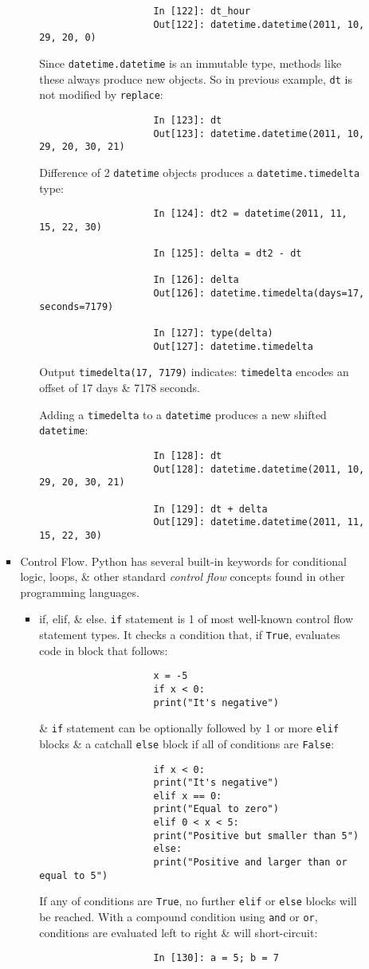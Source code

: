\documentclass{article}
\begin{document}
\begin{itemize}
\begin{itemize}
\begin{itemize}
\begin{itemize}
\begin{verbatim}
					In [122]: dt_hour
					Out[122]: datetime.datetime(2011, 10, 29, 20, 0)
				\end{verbatim}
				Since {\tt datetime.datetime} is an immutable type, methods like these always produce new objects. So in previous example, {\tt dt} is not modified by {\tt replace}:
				\begin{verbatim}
					In [123]: dt
					Out[123]: datetime.datetime(2011, 10, 29, 20, 30, 21)
				\end{verbatim}
				Difference of 2 {\tt datetime} objects produces a {\tt datetime.timedelta} type:
				\begin{verbatim}
					In [124]: dt2 = datetime(2011, 11, 15, 22, 30)
					
					In [125]: delta = dt2 - dt
					
					In [126]: delta
					Out[126]: datetime.timedelta(days=17, seconds=7179)
					
					In [127]: type(delta)
					Out[127]: datetime.timedelta
				\end{verbatim}
				Output {\tt timedelta(17, 7179)} indicates: {\tt timedelta} encodes an offset of 17 days \& 7178 seconds.
				
				Adding a {\tt timedelta} to a {\tt datetime} produces a new shifted {\tt datetime}:
				\begin{verbatim}
					In [128]: dt
					Out[128]: datetime.datetime(2011, 10, 29, 20, 30, 21)
					
					In [129]: dt + delta
					Out[129]: datetime.datetime(2011, 11, 15, 22, 30)
				\end{verbatim}
			\end{itemize}
			\item {\sf Control Flow.} Python has several built-in keywords for conditional logic, loops, \& other standard {\it control flow} concepts found in other programming languages.
			\begin{itemize}
				\item {\sf if, elif, \& else.} {\tt if} statement is 1 of most well-known control flow statement types. It checks a condition that, if {\tt True}, evaluates code in block that follows:
				\begin{verbatim}
					x = -5
					if x < 0:
					print("It's negative")
				\end{verbatim}
				\& {\tt if} statement can be optionally followed by 1 or more {\tt elif} blocks \& a catchall {\tt else} block if all of conditions are {\tt False}:
				\begin{verbatim}
					if x < 0:
					print("It's negative")
					elif x == 0:
					print("Equal to zero")
					elif 0 < x < 5:
					print("Positive but smaller than 5")
					else:
					print("Positive and larger than or equal to 5")
				\end{verbatim}
				If any of conditions are {\tt True}, no further {\tt elif} or {\tt else} blocks will be reached. With a compound condition using {\tt and} or {\tt or}, conditions are evaluated left to right \& will short-circuit:
				\begin{verbatim}
					In [130]: a = 5; b = 7
					

\end{verbatim}
\end{itemize}
\end{itemize}
\end{itemize}
\end{itemize}
\end{document}
